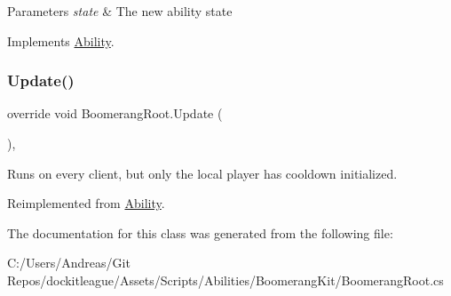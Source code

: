 \begin{DoxyParams}{Parameters}
{\em state} & The new ability state\\
\hline
\end{DoxyParams}


Implements \hyperlink{class_ability_a10f7f3c2b63eeef6e352aee48d246384}{Ability}.

\hypertarget{class_boomerang_root_ae237190bc2d4dbddcf21a25ee3c96dc9}{}\label{class_boomerang_root_ae237190bc2d4dbddcf21a25ee3c96dc9} 
\subsubsection{\texorpdfstring{Update()}{Update()}}
{\footnotesize\ttfamily override void Boomerang\+Root.\+Update (\begin{DoxyParamCaption}{ }\end{DoxyParamCaption})\hspace{0.3cm}{\ttfamily [protected]}, {\ttfamily [virtual]}}



Runs on every client, but only the local player has cooldown initialized. 



Reimplemented from \hyperlink{class_ability_a88d799f38be464be5f0a9a315efb2d0b}{Ability}.



The documentation for this class was generated from the following file\+:\begin{DoxyCompactItemize}
\item 
C\+:/\+Users/\+Andreas/\+Git Repos/dockitleague/\+Assets/\+Scripts/\+Abilities/\+Boomerang\+Kit/Boomerang\+Root.\+cs\end{DoxyCompactItemize}
